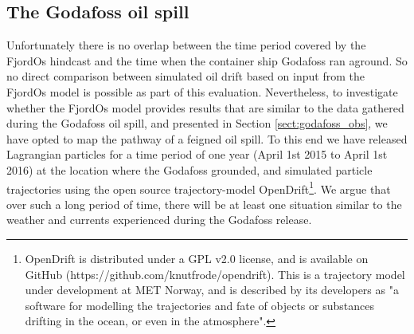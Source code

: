 \subsection{The Godafoss oil spill}
\label{sect:godafoss_model}
Unfortunately there is no overlap between the time period covered by the FjordOs hindcast and the time when the container ship Godafoss ran aground. So no direct comparison between simulated oil drift based on input from the FjordOs model is possible as part of this evaluation. Nevertheless, to investigate whether the FjordOs model provides results that are similar to the data gathered during the Godafoss oil spill, and presented in Section \ref{sect:godafoss_obs}, we have opted to map the pathway of a feigned oil spill. To this end we have released Lagrangian particles for a time period of one year (April 1st 2015 to April 1st 2016) at the location where the Godafoss grounded, and simulated particle trajectories using the open source trajectory-model OpenDrift\footnote{OpenDrift is distributed under a GPL v2.0 license, and is available on GitHub (https://github.com/knutfrode/opendrift). This is a trajectory model under development at MET Norway, and is described by its developers as "a software for modelling the trajectories and fate of objects or substances drifting in the ocean, or even in the atmosphere".}. We argue that over such a long period of time, there will be at least one situation similar to the weather and currents experienced during the Godafoss release.

